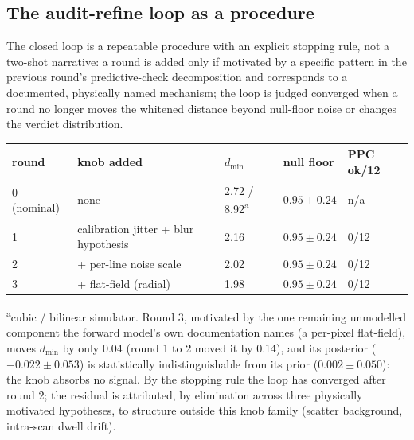 \documentclass{article}
\begin{document}
\subsection{The audit-refine loop as a procedure}
\label{app:loop}
The closed loop is a repeatable procedure with an explicit stopping rule, not a two-shot narrative: a round is added only if motivated by a specific pattern in the previous round's predictive-check decomposition and corresponds to a documented, physically named mechanism; the loop is judged converged when a round no longer moves the whitened distance beyond null-floor noise or changes the verdict distribution.

\begin{center}
\begin{tabular}{lllll}
\toprule
round & knob added & $d_{\min}$ & null floor & PPC ok/12 \\
\midrule
0 (nominal) & none & 2.72 / 8.92\textsuperscript{a} & $0.95\pm0.24$ & n/a \\
1 & calibration jitter + blur hypothesis & 2.16 & $0.95\pm0.24$ & 0/12 \\
2 & + per-line noise scale & 2.02 & $0.95\pm0.24$ & 0/12 \\
3 & + flat-field (radial) & 1.98 & $0.95\pm0.24$ & 0/12 \\
\bottomrule
\end{tabular}
\end{center}

\textsuperscript{a}cubic / bilinear simulator. Round 3, motivated by the one remaining unmodelled component the forward model's own documentation names (a per-pixel flat-field), moves $d_{\min}$ by only 0.04 (round 1 to 2 moved it by 0.14), and its posterior ($-0.022\pm0.053$) is statistically indistinguishable from its prior ($0.002\pm0.050$): the knob absorbs no signal. By the stopping rule the loop has converged after round 2; the residual is attributed, by elimination across three physically motivated hypotheses, to structure outside this knob family (scatter background, intra-scan dwell drift).
\end{document}
